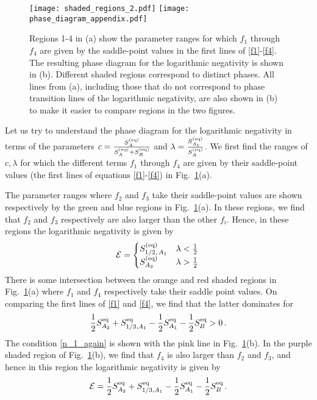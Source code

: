 \documentclass[a4paper,11pt]{article}
\newcommand{\be}{\begin{equation}}
\newcommand{\ee}{\end{equation}}
\newcommand\sE{{\ensuremath{{\mathcal E}}}}
\begin{document}
\begin{enumerate}
\begin{appendix}
 
 \begin{figure}[]
\centering
\texttt{[image: shaded\_regions\_2.pdf]}
\texttt{[image: phase\_diagram\_appendix.pdf]}
\caption{Regions 1-4 in (a) show the parameter ranges for which $f_1$ through $f_4$ are given by the saddle-point values in the first lines of \eqref{f1}-\eqref{f4}. The resulting phase diagram for the logarithmic negativity is shown in (b). Different shaded regions correspond to distinct phases. All lines from (a), including those that do not correspond to phase transition lines of the logarithmic negativity, are also shown in (b) to make it easier to compare regions in the two figures.}
\label{fig:regions}
\end{figure} 
Let us try to understand the phase diagram for the logarithmic negativity in terms of the parameters $c = \frac{S^{\rm (eq)}_A}{S^{\rm (eq)}_A+S^{\rm (eq)}_B}$ and $\lambda = \frac{S^{\rm (eq)}_{A_1}}{S^{\rm (eq)}_{A}}$. We first find the ranges of $c, \lambda$ for which the different terms $f_1$ through $f_4$ are given by their saddle-point values (the first lines of equations \eqref{f1}-\eqref{f4}) in Fig.~\ref{fig:regions}(a). 

The parameter ranges where $f_2$ and $f_3$ take their saddle-point values are shown respectively by the green and blue regions in Fig.~\ref{fig:regions}(a). In these regions, we find that $f_2$ and $f_3$ respectively are also larger than the other $f_i$. Hence, in these regions the logarithmic negativity is given by 
\be \label{ln_me}
\sE = \begin{cases} S^{\rm (eq)}_{1/2, \, A_1} & \lambda <\frac{1}{2} \\ 
S^{\rm (eq)}_{A_2} & \lambda > \frac{1}{2} \, 
\end{cases} 
\ee
There is some intersection between the orange and red shaded regions in Fig.~\ref{fig:regions}(a) where $f_1$ and $f_4$ respectively take their saddle point values. 
On comparing the first lines of \eqref{f1} and \eqref{f4}, we find that the latter dominates for 
\be 
\frac{1}{2}S_{A_2}^{\rm eq} + S_{1/3, A_1}^{\rm eq} - \frac{1}{2} S_{A_1}^{\rm eq} - \frac{1}{2} S^{\rm eq}_{B}>0 \, . \label{n_1_again} 
\ee
The condition \eqref{n_1_again} is shown with the pink line in Fig.~\ref{fig:regions}(b). In the purple shaded region of Fig.~\ref{fig:regions}(b), we find that $f_4$ is also larger than $f_2$ and $f_3$, and hence in this region the logarithmic negativity is given by 
\be 
\sE = \frac{1}{2}S_{A_2}^{\rm eq} + S_{1/3, A_1}^{\rm eq} - \frac{1}{2} S_{A_1}^{\rm eq} - \frac{1}{2} S^{\rm eq}_{B} \, . \label{ln_es} 
\ee


\end{appendix}
\end{enumerate}
\end{document}
